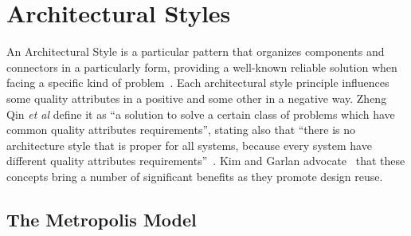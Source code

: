 




%
%  





\section{Architectural Styles} \label{sec:arch-styles}

An Architectural Style is a particular pattern that organizes components and connectors in a particularly form, providing a well-known reliable solution when facing a specific kind of problem~\citep{Kazman}. Each architectural style principle influences some quality attributes in a positive and some other in a negative way. Zheng Qin \textit{et al} define it as ``a solution to solve a certain class of problems which have common quality attributes requirements'', stating also that ``there is no architecture style that is proper for all systems, because every system have different quality attributes requirements''~\citep{Qin2008}. Kim and Garlan advocate~\citep{Kim2010} that these concepts bring a number of significant benefits as they promote design reuse.

\subsection{The Metropolis Model} \label{sec:metro-model}


